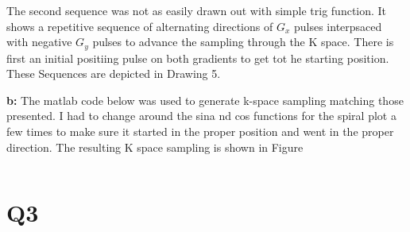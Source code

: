 \documentclass[12pt]{article}
\begin{document}
The second sequence was not as easily drawn out with simple trig function. It shows a repetitive sequence of alternating directions of $G_x$ pulses interpsaced with negative $G_y$ pulses to advance the sampling through the K space. There is first an initial positiing pulse on both gradients to get tot he starting position. These Sequences are depicted in Drawing 5.

\noindent\textbf{b: }
The matlab code below was used to generate k-space sampling matching those presented. I had to change around the sina nd cos functions for the spiral plot a few times to make sure it started in the proper position and went in the proper direction. The resulting K space sampling is shown in Figure~

\begin{lstlisting}[style=Matlab-editor]
%
\end{lstlisting}

\section{Q3}
\end{document}
